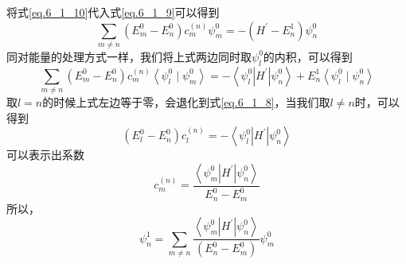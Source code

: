         将式\ref{eq.6_1_10}代入式\ref{eq.6_1_9}可以得到
        \begin{equation}
            \sum_{m \neq n}\left(E_{m}^{0}-E_{n}^{0}\right) c_{m}^{(n)} \psi_{m}^{0}=-\left(H^{\prime}-E_{n}^{1}\right) \psi_{n}^{0}
        \end{equation}
        同对能量的处理方式一样，我们将上式两边同时取$\psi_l^0$的内积，可以得到
        \begin{equation}
            \sum_{m \neq n}\left(E_{m}^{0}-E_{n}^{0}\right) c_{m}^{(n)}\left\langle\psi_{l}^{0} \mid \psi_{m}^{0}\right\rangle=-\left\langle\psi_{l}^{0}\left|H^{\prime}\right| \psi_{n}^{0}\right\rangle+E_{n}^{1}\left\langle\psi_{l}^{0} \mid \psi_{n}^{0}\right\rangle
        \end{equation}
        取$l=n$的时候上式左边等于零，会退化到式\ref{eq.6_1_8}，当我们取$l\neq n$时，可以得到
        \begin{equation}
            \left(E_{l}^{0}-E_{n}^{0}\right) c_{l}^{(n)}=-\left\langle\psi_{l}^{0}\left|H^{\prime}\right| \psi_{n}^{0}\right\rangle
        \end{equation}
        可以表示出系数
        \begin{equation}
            c_{m}^{(n)}=\frac{\left\langle\psi_{m}^{0}\left|H^{\prime}\right| \psi_{n}^{0}\right\rangle}{E_{n}^{0}-E_{m}^{0}}
        \end{equation}
        所以，
        \begin{equation}
        \label{eq.6_1_15}
            \boxed{\psi_{n}^{1}=\sum_{m \neq n} \frac{\left\langle\psi_{m}^{0}\left|H^{\prime}\right| \psi_{n}^{0}\right\rangle}{\left(E_{n}^{0}-E_{m}^{0}\right)} \psi_{m}^{0}}
        \end{equation}


